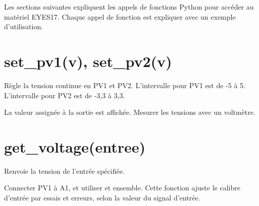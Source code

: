\documentclass[a4paper,12pt,french]{sphinxmanual}
\begin{document}
Les sections suivantes expliquent les appels de fonctions Python pour
accéder au matériel EYES17. Chaque appel de fonction est expliquer
avec un exemple d’utilisation.


\section{set\_pv1(v), set\_pv2(v)}
\label{\detokenize{7.1:set-pv1-v-set-pv2-v}}
Règle la tension continue en PV1 et PV2. L’intervalle pour PV1 est
de -5 à 5. L’intervalle pour PV2 est de -3,3 à 3,3.

\begin{sphinxVerbatim}[commandchars=\\\{\}]
 
 
\end{sphinxVerbatim}

La valeur assignée à la sortie est affichée. Mesurer les tensions
avec un voltmètre.


\section{get\_voltage(entree)}
\label{\detokenize{7.1:get-voltage-entree}}
Renvoie la tension de l’entrée spécifiée.

\begin{sphinxVerbatim}[commandchars=\\\{\}]
 
 
 
 
 
\end{sphinxVerbatim}

Connecter PV1 à A1, et utiliser  et 
ensemble. Cette fonction ajuste le calibre d’entrée par essais et
erreurs, selon la valeur du signal d’entrée.
\end{document}
